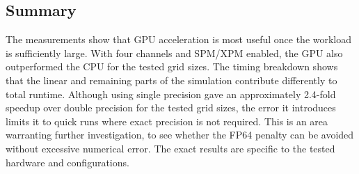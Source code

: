 \subsection{Summary}

The measurements show that GPU acceleration is most useful once the workload is sufficiently
large. With four channels and SPM/XPM enabled, the GPU also outperformed the CPU for the
tested grid sizes. The timing breakdown shows that the linear and remaining parts of the
simulation contribute differently to total runtime. Although using single precision gave an
approximately 2.4-fold speedup over double precision for the tested grid sizes, the error it
introduces limits it to quick runs where exact precision is not required.
This is an area warranting further investigation, to see whether the FP64 penalty can be avoided
without excessive numerical error. The exact results are specific to the tested hardware 
and configurations.
